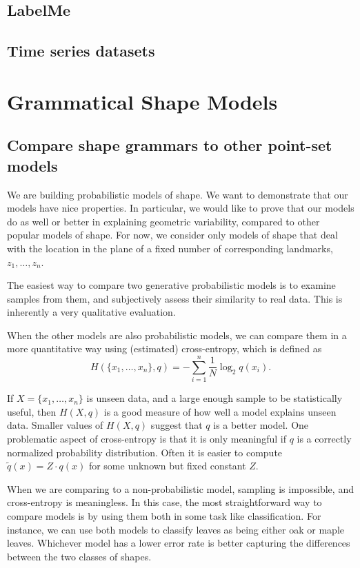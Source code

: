 \documentclass{book}
\begin{document}
\subsection{LabelMe}
\label{sec-2_1_5}
\subsection{Time series datasets}
\label{sec-2_1_6}
\section{Grammatical Shape Models}
\label{sec-2_2}
\subsection{Compare shape grammars to other point-set models}
\label{sec-2_2_1}

We are building probabilistic models of shape. We want to demonstrate
that our models have nice properties. In particular, we would like to
prove that our models do as well or better in explaining geometric
variability, compared to other popular models of shape. For now, we
consider only models of shape that deal with the location in the plane
of a fixed number of corresponding landmarks, $z_1, \dots, z_n$.

The easiest way to compare two generative probabilistic models is to
examine samples from them, and subjectively assess their similarity to
real data. This is inherently a very qualitative evaluation.

When the other models are also probabilistic models, we can compare
them in a more quantitative way using (estimated) cross-entropy, which
is defined as
$$H(\{x_1,\dots,x_n\}, q) = - \sum_{i=1}^n \frac{1}{N} \log_2 q(x_i).$$

If $X = \{x_1,\dots,x_n\}$ is unseen data, and a large enough sample
to be statistically useful, then $H(X,q)$ is a good measure of how
well a model explains unseen data. Smaller values of $H(X,q)$ suggest
that $q$ is a better model. One problematic aspect of cross-entropy is
that it is only meaningful if $q$ is a correctly normalized
probability distribution. Often it is easier to compute
$\widetilde{q}(x) = Z\cdot q(x)$ for some unknown but fixed constant
$Z$.

When we are comparing to a non-probabilistic model, sampling is
impossible, and cross-entropy is meaningless. In this case, the most
straightforward way to compare models is by using them both in some
task like classification. For instance, we can use both models to
classify leaves as being either oak or maple leaves. Whichever model
has a lower error rate is better capturing the differences between the
two classes of shapes.
\end{document}
